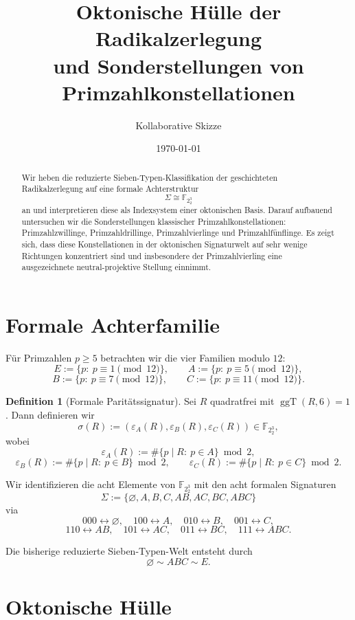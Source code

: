 \documentclass[11pt,a4paper]{article}
\title{Oktonische Hülle der Radikalzerlegung\\
	und Sonderstellungen von Primzahlkonstellationen}
\author{Kollaborative Skizze}
\date{\today}
\theoremstyle{definition}
\newtheorem{definition}[satz]{Definition}
\theoremstyle{remark}
\newcommand{\F}{\mathbb{F}_2}
\newcommand{\ggT}{\operatorname{ggT}}
\newcommand{\sig}{\sigma}
\begin{document}
	\maketitle
	
	\begin{abstract}
		Wir heben die reduzierte Sieben-Typen-Klassifikation der geschichteten Radikalzerlegung
		auf eine formale Achterstruktur
		\[
		\Sigma \cong \F_2^3
		\]
		an und interpretieren diese als Indexsystem einer oktonischen Basis.
		Darauf aufbauend untersuchen wir die Sonderstellungen klassischer Primzahlkonstellationen:
		Primzahlzwillinge, Primzahldrillinge, Primzahlvierlinge und Primzahlfünflinge.
		Es zeigt sich, dass diese Konstellationen in der oktonischen Signaturwelt auf sehr wenige
		Richtungen konzentriert sind und insbesondere der Primzahlvierling eine ausgezeichnete
		neutral-projektive Stellung einnimmt.
	\end{abstract}
	
	\section{Formale Achterfamilie}
	
	Für Primzahlen \(p\ge 5\) betrachten wir die vier Familien modulo \(12\):
	\[
	E:=\{p:\ p\equiv 1 \pmod{12}\},\qquad
	A:=\{p:\ p\equiv 5 \pmod{12}\},
	\]
	\[
	B:=\{p:\ p\equiv 7 \pmod{12}\},\qquad
	C:=\{p:\ p\equiv 11 \pmod{12}\}.
	\]
	
	\begin{definition}[Formale Paritätssignatur]
		Sei \(R\) quadratfrei mit \(\ggT(R,6)=1\). Dann definieren wir
		\[
		\sig(R):=(\varepsilon_A(R),\varepsilon_B(R),\varepsilon_C(R))\in\F_2^3,
		\]
		wobei
		\[
		\varepsilon_A(R):=\#\{p\mid R:\ p\in A\}\bmod 2,
		\]
		\[
		\varepsilon_B(R):=\#\{p\mid R:\ p\in B\}\bmod 2,
		\qquad
		\varepsilon_C(R):=\#\{p\mid R:\ p\in C\}\bmod 2.
		\]
	\end{definition}
	
	Wir identifizieren die acht Elemente von \(\F_2^3\) mit den acht formalen Signaturen
	\[
	\Sigma:=\{\varnothing,A,B,C,AB,AC,BC,ABC\}
	\]
	via
	\[
	000\leftrightarrow \varnothing,\quad
	100\leftrightarrow A,\quad
	010\leftrightarrow B,\quad
	001\leftrightarrow C,
	\]
	\[
	110\leftrightarrow AB,\quad
	101\leftrightarrow AC,\quad
	011\leftrightarrow BC,\quad
	111\leftrightarrow ABC.
	\]
	
	Die bisherige reduzierte Sieben-Typen-Welt entsteht durch
	\[
	\varnothing \sim ABC \sim E.
	\]
	
	\section{Oktonische Hülle}
	
\end{document}
